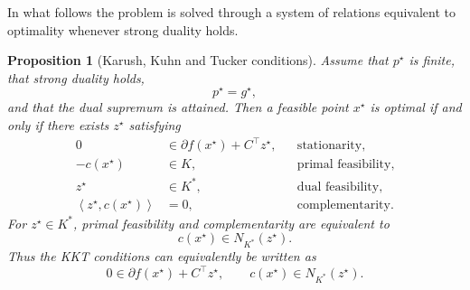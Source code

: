 \documentclass[a4paper,11pt]{book}
\theoremstyle{plain}
\newtheorem{proposition}[theorem]{Proposition}
\theoremstyle{definition}
\theoremstyle{remark}
\numberwithin{equation}{chapter}
\numberwithin{algorithm}{chapter}
\newcommand{\inner}[2]{\left\langle #1, #2 \right\rangle}
\begin{document}
	In what follows the problem is solved through a system of relations equivalent
	to optimality whenever strong duality holds.
	
	\begin{proposition}[Karush, Kuhn and Tucker conditions]
		Assume that \(p^\star\) is finite, that strong duality holds,
		\[
		p^\star=g^\star,
		\]
		and that the dual supremum is attained. Then a feasible point \(x^\star\) is
		optimal if and only if there exists \(z^\star\) satisfying
		\begin{align}
			0&\in\partial f(x^\star)+C^\top z^\star,
			&&\text{stationarity},\\
			-c(x^\star)&\in K,
			&&\text{primal feasibility},\\
			z^\star&\in K^*,
			&&\text{dual feasibility},\\
			\inner{z^\star}{c(x^\star)}&=0,
			&&\text{complementarity}.
		\end{align}
		For \(z^\star\in K^*\), primal feasibility and complementarity are
		equivalent to
		\begin{equation}
			c(x^\star)\in N_{K^*}(z^\star).
		\end{equation}
		Thus the KKT conditions can equivalently be written as
		\begin{equation}
			0\in\partial f(x^\star)+C^\top z^\star,
			\qquad
			c(x^\star)\in N_{K^*}(z^\star).
		\end{equation}
	\end{proposition}
	
\end{document}
